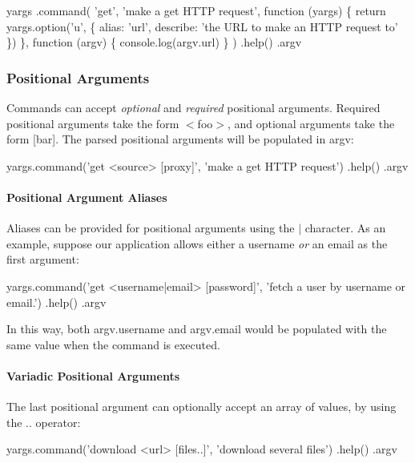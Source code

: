 \begin{DoxyCode}
yargs
  .command(
    'get',
    'make a get HTTP request',
    function (yargs) \{
      return yargs.option('u', \{
        alias: 'url',
        describe: 'the URL to make an HTTP request to'
      \})
    \},
    function (argv) \{
      console.log(argv.url)
    \}
  )
  .help()
  .argv
\end{DoxyCode}


\subsubsection*{Positional Arguments}

Commands can accept {\itshape optional} and {\itshape required} positional arguments. Required positional arguments take the form {\ttfamily $<$foo$>$}, and optional arguments take the form {\ttfamily \mbox{[}bar\mbox{]}}. The parsed positional arguments will be populated in {\ttfamily argv}\+:


\begin{DoxyCode}
yargs.command('get <source> [proxy]', 'make a get HTTP request')
  .help()
  .argv
\end{DoxyCode}


\paragraph*{Positional Argument Aliases}

Aliases can be provided for positional arguments using the {\ttfamily $\vert$} character. As an example, suppose our application allows either a username {\itshape or} an email as the first argument\+:


\begin{DoxyCode}
yargs.command('get <username|email> [password]', 'fetch a user by username or email.')
  .help()
  .argv
\end{DoxyCode}


In this way, both {\ttfamily argv.\+username} and {\ttfamily argv.\+email} would be populated with the same value when the command is executed.

\paragraph*{Variadic Positional Arguments}

The last positional argument can optionally accept an array of values, by using the {\ttfamily ..} operator\+:


\begin{DoxyCode}
yargs.command('download <url> [files..]', 'download several files')
  .help()
  .argv
\end{DoxyCode}


